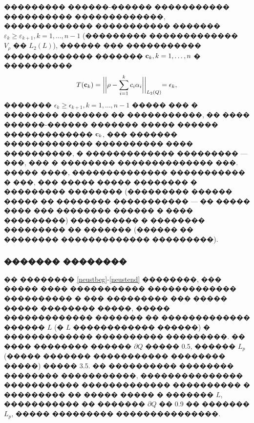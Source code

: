 \documentclass[a4paper]{article}
\begin{document}
��������� ������-������ ����������� ���������� �������������, ������������� ����������� ������� $\varepsilon_k \geq \varepsilon_{k+1}, k=1, \dots, n-1$ (��������� ������������� $V_{\rho} \text{ �� } L_2(L)$), ������ ��� ����������� ������������� ������� ${\bf c}_k, k=1,\dots,n$ � ����������
\begin{equation*}
  T({\bf c}_k)=\biggl|\biggl|\rho - \sum_{i=1}^k c_i \alpha_i\biggl|\biggl|_{L_2(Q)}=\epsilon_k,
\end{equation*}
������� $\epsilon_k \geq \epsilon_{k+1}, k=1, \dots, n-1$ ����� ��� � �������� ������� �� �����������, �� ���� ������-������ ������� ����� ������ ������������� ${\bf c}_k$, ��� �������
������������� ���������� ���� ����������, � ������������� ��������� --- ���, ��� � �������� �������������� ���.
����� ����, �������������� ����������� � ���, ��� ����� ����� �������� � ��������� �������� (��������� ������ ����� �� �������� ����������� --- �� ����� ���� ��� �������� ������ � ���� ���������) ���������� � �������� ��������� �� ������� (������ �� �������� ������������� ���������).

\subsubsection{������� ��������}
�� �������� \ref{neustbeg}-\ref{neustend} ��������, ��� ����� ���� ����������� ������������� ���������� � ��� ��������� ��� ����� ����� �������� �����, ����� ������������� ������� �� ������������� ������ $L$ (� $L$ ������������ ������) � ������������� ���������� ���������.
�� ���� �������� ������ $\partial Q$ ����� 0.5, ������ $L_p$ (����� ������� ����������� �������� �����) ����� 3.5. �� ���������� �������� �������� �����������, ��������������� ����������� ������������� ���������� � ��������� �� ����� ����� � ������� $L$, ����������� �� ������� $\partial Q$ �� 0.9 �� ������� $L_p$, ����� ��������� ���������������.
\end{document}

